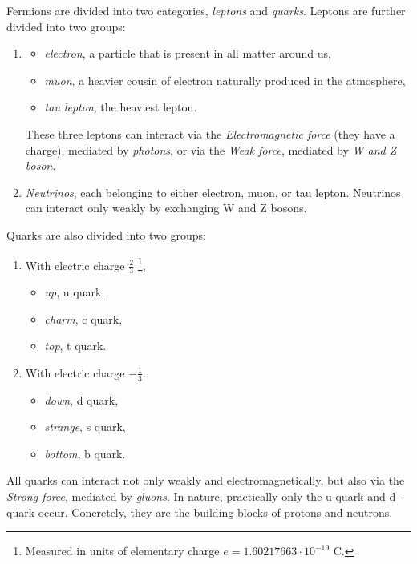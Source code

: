 Fermions are divided into two categories, \emph{leptons} and \emph{quarks}. 
Leptons are further divided into two groups:
\begin{enumerate}
    \item  
    \begin{itemize}
        \item \emph{electron}, a particle that is present in all matter around us,
        \item \emph{muon}, a heavier cousin of electron naturally produced in the atmosphere,
        \item \emph{tau lepton}, the heaviest lepton.
    \end{itemize}
    These three leptons can interact via the \emph{Electromagnetic force} (they have a charge), mediated by \emph{photons}, or via the \emph{Weak force}, mediated by \emph{W and Z boson}. 
    \item \emph{Neutrinos}, each belonging to either electron, muon, or tau lepton.  
    Neutrinos can interact only weakly by exchanging W and Z bosons.
\end{enumerate}
Quarks are also divided into two groups:
\begin{multicols}{2}
\begin{enumerate}
    \item  
    With electric charge $\frac{2}{3}$ \footnote{Measured in units of elementary charge $e=1.60217663\cdot10^{-19}$ C.},
    \begin{itemize}
        \item \emph{up}, u quark,
        \item \emph{charm}, c quark,
        \item \emph{top}, t quark.
    \end{itemize}
    \item  
    With electric charge $-\frac{1}{3}$.
    \begin{itemize}
        \item \emph{down}, d quark,
        \item \emph{strange}, s quark,
        \item \emph{bottom}, b quark.
    \end{itemize}
\end{enumerate}
\end{multicols}
All quarks can interact not only weakly and electromagnetically, but also via the \emph{Strong force}, mediated by \emph{gluons}.
In nature, practically only the u-quark and d-quark occur. 
Concretely, they are the building blocks of protons and neutrons.

